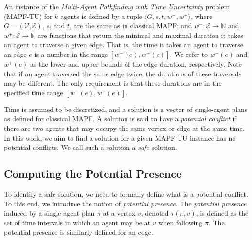 \documentclass[jair,twoside,11pt,theapa]{article}
\newcommand{\tuple}[1]{\langle#1\rangle}
\newcommand{\naturals}{\mathbb{N}}
\newcommand{\vertices}{\mathcal{V}}
\newcommand{\edges}{\mathcal{E}}
\newcommand{\timel}{w^-}
\newcommand{\timeu}{w^+}
\newcommand{\potential}{\tau}
\newcommand{\mapftu}{MAPF-TU\xspace}
\newtheorem{definition}{Definition}
\begin{document}

An instance of the \emph{Multi-Agent Pathfinding with Time Uncertainty} problem (\mapftu) for $k$ agents is defined by a tuple $\tuple{G,s,t, \timel, \timeu}$, where $G=(\vertices, \edges)$, $s$, and $t$, are the same as in classical MAPF; and $\timel: \edges \rightarrow \naturals$ and $\timeu: \edges \rightarrow \naturals$ are functions that return the minimal and maximal duration it takes an agent to traverse a given edge. 
That is, the time it takes an agent to traverse an edge $e$ is a number in the range $[\timel(e), \timeu(e)]$. We refer to $\timel(e)$ and $\timeu(e)$ as the lower and upper bounds of the edge duration, respectively.
Note that if an agent traversed the same edge twice, the durations of these traversals may be different. The only requirement is that these durations are in the specified time range $[\timel(e), \timeu(e)]$. 

Time is assumed to be discretized, and a solution is a vector of single-agent plans as defined for classical MAPF. 
A solution is said to have a \emph{potential conflict} if there are two agents that may occupy the same vertex or edge at the same time.
In this work, we aim to find a solution for a given \mapftu instance has no potential conflicts. 
We call such a solution a \emph{safe} solution.







\subsection{Computing the Potential Presence}
To identify a safe solution, we need to formally define what is a potential conflict. 
To this end, we introduce the notion of \emph{potential presence}. 
The \emph{potential presence} induced by a single-agent plan $\pi$ at a vertex $v$, 
denoted $\potential(\pi,v)$, 
is defined as the set of time intervals in which an agent may be at $v$ when following $\pi$. 
The potential presence is similarly defined for an edge. 
\end{document}
